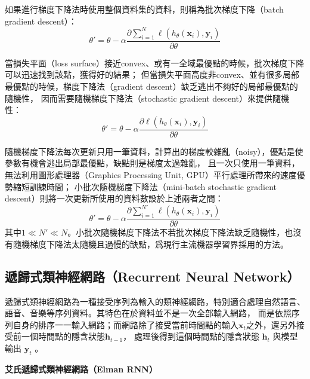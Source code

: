 如果進行梯度下降法時使用整個資料集的資料，則稱為批次梯度下降（batch gradient descent）：
\begin{equation}
    \theta' = \theta - \alpha \frac{ \partial \sum\limits_{i=1}^{N} \ell\left(h_{\theta}\left(\mathbf{x}_{i}\right), \mathbf{y}_{i}\right)}{\partial \theta}
\end{equation}

當損失平面（loss surface）接近convex、或有一全域最優點的時候，批次梯度下降可以迅速找到該點，獲得好的結果；
但當損失平面高度非convex、並有很多局部最優點的時候，梯度下降法（gradient descent）缺乏逃出不夠好的局部最優點的隨機性，
因而需要隨機梯度下降法（stochastic gradient descent）來提供隨機性：
\begin{equation}
    \theta' = \theta - \alpha \frac{ \partial \ell\left(h_{\theta}\left(\mathbf{x}_{i}\right), \mathbf{y}_{i}\right)}{\partial \theta}
\end{equation}

隨機梯度下降法每次更新只用一筆資料，計算出的梯度較雜亂（noisy），優點是使參數有機會逃出局部最優點，缺點則是梯度太過雜亂，
且一次只使用一筆資料，無法利用圖形處理器（Graphics Processing Unit, GPU）平行處理所帶來的速度優勢縮短訓練時間；
小批次隨機梯度下降法（mini-batch stochastic gradient descent）則將一次更新所使用的資料數設於上述兩者之間：
\begin{equation}
    \theta' = \theta - \alpha \frac{ \partial \sum\limits_{i=1}^{N'} \ell\left(h_{\theta}\left(\mathbf{x}_{i}\right), \mathbf{y}_{i}\right)}{\partial \theta}
\end{equation}
其中$1 \ll N' \ll N$。小批次隨機梯度下降法不若批次梯度下降法缺乏隨機性，也沒有隨機梯度下降法太隨機且過慢的缺點，爲現行主流機器學習界採用的方法。


\subsection{遞歸式類神經網路（Recurrent Neural Network）}
遞歸式類神經網路為一種接受序列為輸入的類神經網路，特別適合處理自然語言、語音、音樂等序列資料。其特色在於資料並不是一次全部輸入網路，
而是依照序列自身的排序一一輸入網路；而網路除了接受當前時間點的輸入$\mathbf{x}_t$之外，還另外接受前一個時間點的隱含狀態$\mathbf{h}_{t-1}$，
處理後得到這個時間點的隱含狀態 $\mathbf{h}_{t}$ 與模型輸出 $\mathbf{y}_{t}$ 。

\vspace{12pt}
\noindent\textbf{艾氏遞歸式類神經網路（Elman RNN）}
\vspace{4pt}

